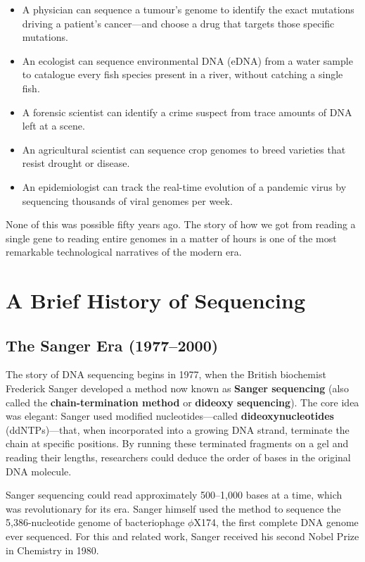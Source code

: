 \begin{itemize}[itemsep=2pt]
  \item A physician can sequence a tumour's genome to identify the exact mutations driving a patient's cancer---and choose a drug that targets those specific mutations.
  \item An ecologist can sequence environmental DNA (eDNA) from a water sample to catalogue every fish species present in a river, without catching a single fish.
  \item A forensic scientist can identify a crime suspect from trace amounts of DNA left at a scene.
  \item An agricultural scientist can sequence crop genomes to breed varieties that resist drought or disease.
  \item An epidemiologist can track the real-time evolution of a pandemic virus by sequencing thousands of viral genomes per week.
\end{itemize}

None of this was possible fifty years ago. The story of how we got from reading a single gene to reading entire genomes in a matter of hours is one of the most remarkable technological narratives of the modern era.

\section{A Brief History of Sequencing}
\label{sec:intro:history}

\subsection{The Sanger Era (1977--2000)}
\label{subsec:intro:sanger}

The story of DNA sequencing begins in 1977, when the British biochemist Frederick Sanger developed a method now known as \textbf{Sanger sequencing} (also called the \textbf{chain-termination method} or \textbf{dideoxy sequencing}). The core idea was elegant: Sanger used modified nucleotides---called \textbf{dideoxynucleotides} (ddNTPs)---that, when incorporated into a growing DNA strand, terminate the chain at specific positions. By running these terminated fragments on a gel and reading their lengths, researchers could deduce the order of bases in the original DNA molecule.

Sanger sequencing could read approximately 500--1,000 bases at a time, which was revolutionary for its era. Sanger himself used the method to sequence the 5,386-nucleotide genome of bacteriophage $\phi$X174, the first complete DNA genome ever sequenced. For this and related work, Sanger received his second Nobel Prize in Chemistry in 1980.

